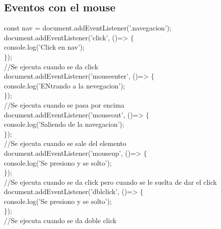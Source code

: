 \documentclass[10pt,a4paper]{article}
\begin{document}
\subsection{Eventos con el mouse}
const nav = document.addEventListener('.navegacion'); \\
document.addEventListener('click', ()=> $ \{ $ \\ 
console.log('Click en nav');  \\
$ \} $); \\
//Se ejecuta cuando se da click \\
document.addEventListener('mouseenter', ()=> $ \{ $ \\ 
console.log('ENtrando a la nevegacion');  \\
$ \} $); \\
//Se ejecuta cuando se pasa por encima \\
document.addEventListener('mouseout', ()=> $ \{ $ \\ 
console.log('Saliendo de la navegacion');  \\
$ \} $); \\
//Se ejecuta cuando se sale del elemento \\
document.addEventListener('mouseup', ()=> $ \{ $ \\ 
console.log('Se presiono y se solto');  \\
$ \} $); \\
//Se ejecuta cuando se da click pero cuando se le suelta de dar el click \\
document.addEventListener('dblclick', ()=> $ \{ $ \\ 
console.log('Se presiono y se solto');  \\
$ \} $); \\
//Se ejecuta cuando se da doble click \\
\end{document}
